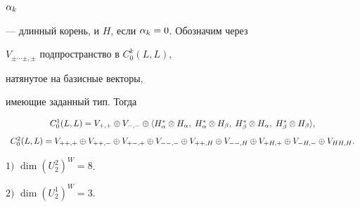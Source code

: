 $\alpha_k$ 


--- длинный корень, и $H$, если $\alpha_k=0$. Обозначим через 


$V_{\pm \dotsb \pm,\pm}$ подпространство в $C^k_0(L,L)$, 


натянутое на базисные векторы, 


имеющие заданный тип. Тогда 


\begin{equation} 


\begin{array}{c} 


C^1_0(L,L)=V_{+,+}\oplus V_{-,-}\oplus 


\langle H^*_{\a}\otimes H_{\a},\; 


H^*_{\a}\otimes H_{\b},\; H^*_{\b}\otimes 


H_{\a},\; H^*_{\b}\otimes H_{\b}\rangle, \\[3mm] 


% 


C^2_0(L,L)=V_{++,+}\oplus 


V_{++,-}\oplus V_{+-,+}\oplus V_{--,-}\oplus 


V_{++,H}\oplus V_{--,H}\oplus 


V_{+H,+}\oplus V_{-H,-}\oplus V_{HH,H}. 


\end{array} 


\end{equation} 


 


\begin{lem} 


 


$1)$ $\dim (U^2_2)^W=8$. 


 


$2)$ $\dim (U^{1}_{2})^{W}=3.$ 


 


\end{lem} 


 


